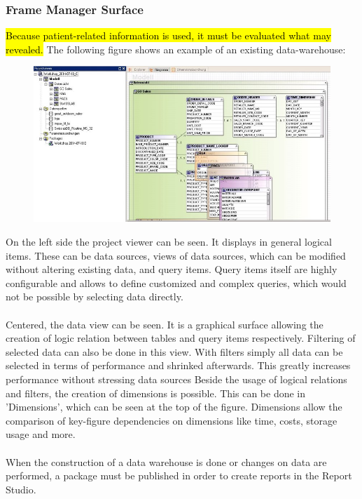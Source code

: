 \documentclass[a4paper]{article}
\begin{document}
	\subsubsection{Frame Manager Surface}
	\hl{Because patient-related information is used, it must be evaluated what may
	revealed.} The following figure shows an example of an existing
	data-warehouse:\\
	\begin{figure}[!ht]
		  \centering
		      \includegraphics[width=1.0\textwidth]{frameworkM_2}
		  \caption{}
	\end{figure}
	On the left side the project viewer can be seen. It displays in general logical
	items. These can be data sources, views of data sources, which can be modified
	without altering existing data, and query items. Query items itself are highly configurable and allows to define customized and complex
	queries, which would not be possible by selecting data directly.\\
	\\
	Centered, the data view can be seen. It is a graphical surface allowing the
	creation of logic relation between tables and query items respectively.
	Filtering of selected data can also be done in this view. With filters
	simply all data can be selected in terms of performance and shrinked
	afterwards. This greatly increases performance without stressing data sources
	Beside the usage of logical relations and filters, the creation of
	dimensions is possible.
	This can be done in 'Dimensions', which can be seen at the top of the figure. 
	Dimensions allow the comparison of
	key-figure dependencies on dimensions like time, costs, storage usage and
	more.\\
	\\
	When the construction of a data warehouse is done or changes on data are
	performed, a package must be published in order to create reports in the Report
	Studio.
\end{document}

